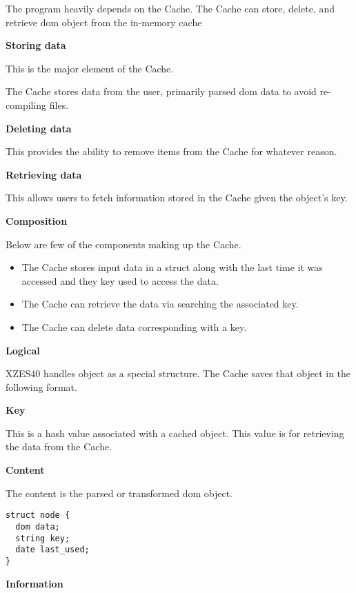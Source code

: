 The program heavily depends on the Cache.
The Cache can store, delete, and retrieve \gls{dom} object from the in-memory cache 

\textbf{Storing data}

This is the major element of the Cache.

The Cache stores data from the user, primarily parsed \gls{dom} data to avoid re-compiling files.

\textbf{Deleting data}

This provides the ability to remove items from the Cache for whatever reason.

\textbf{Retrieving data}

This allows users to fetch information stored in the Cache given the object's key.

\textbf{Composition}

Below are few of the components making up the Cache.

\begin{itemize}
    \item The Cache stores input data in a \gls{struct} along with the last time it was accessed and they key used to access the data.
    \item The Cache can retrieve the data via searching the associated key.
    \item The Cache can delete data corresponding with a key.
\end{itemize}

\textbf{Logical}

XZES40 handles object as a special structure.
The Cache saves that object in the following format.

\textbf{Key}

This is a hash value associated with a cached object.
This value is for retrieving the data from the Cache.

\textbf{Content}

The content is the parsed or transformed \gls{dom} object.

\begin{lstlisting}
struct node {
  dom data;
  string key;
  date last_used;
}
\end{lstlisting}

\textbf{Information}

